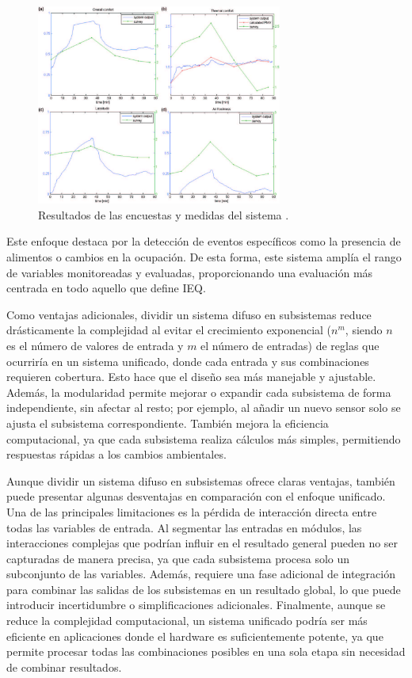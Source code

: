 \begin{figure}[H]
	\centering
	\includegraphics[width=0.72\textwidth]{imgs/fuzzy-inference-system-results.JPG}
	\caption{Resultados de las encuestas y medidas del sistema \parencite{jablonski2018fuzzy}.}
	\label{fig:fuzzy-inference-system-results}
\end{figure}

Este enfoque destaca por la detección de eventos específicos como la presencia de alimentos o cambios en la ocupación. De esta forma, este sistema amplía el rango de variables monitoreadas y evaluadas, proporcionando una evaluación más centrada en todo aquello que define IEQ.

Como ventajas adicionales, dividir un sistema difuso en subsistemas reduce drásticamente la complejidad al evitar el crecimiento exponencial ($n^m$, siendo $n$ es el número de valores de entrada y $m$ el número de entradas) de reglas que ocurriría en un sistema unificado, donde cada entrada y sus combinaciones requieren cobertura. Esto hace que el diseño sea más manejable y ajustable. Además, la modularidad permite mejorar o expandir cada subsistema de forma independiente, sin afectar al resto; por ejemplo, al añadir un nuevo sensor solo se ajusta el subsistema correspondiente. También mejora la eficiencia computacional, ya que cada subsistema realiza cálculos más simples, permitiendo respuestas rápidas a los cambios ambientales.

Aunque dividir un sistema difuso en subsistemas ofrece claras ventajas, también puede presentar algunas desventajas en comparación con el enfoque unificado. Una de las principales limitaciones es la pérdida de interacción directa entre todas las variables de entrada. Al segmentar las entradas en módulos, las interacciones complejas que podrían influir en el resultado general pueden no ser capturadas de manera precisa, ya que cada subsistema procesa solo un subconjunto de las variables. Además, requiere una fase adicional de integración para combinar las salidas de los subsistemas en un resultado global, lo que puede introducir incertidumbre o simplificaciones adicionales. Finalmente, aunque se reduce la complejidad computacional, un sistema unificado podría ser más eficiente en aplicaciones donde el hardware es suficientemente potente, ya que permite procesar todas las combinaciones posibles en una sola etapa sin necesidad de combinar resultados.

